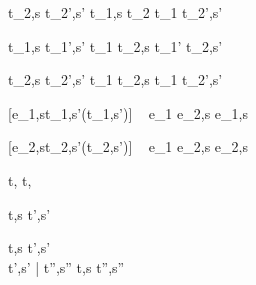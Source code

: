   {t_2,s  t_2',s'}
  {t_1,s \And t_2  t_1 \And t_2',s'}


  {t_1,s  t_1',s'}
  {t_1 \Or t_2,s  t_1' \Or t_2,s'}

  {t_2,s  t_2',s' }
  {t_1 \Or t_2,s  t_1 \Or t_2',s'}


[e_1,s\evaluate t_1,s'\wedge \neg\Failing(t_1,s')]
  {\ }
  {e_1 \Xor e_2,s \handle{\Left} e_1,s}

[e_2,s\evaluate t_2,s'\wedge \neg\Failing(t_2,s')]
  {\ }
  {e_1 \Xor e_2,s \handle{\Right} e_2,s}











  { }
  {t,\Sigma {} t,\Sigma}





  {t,s  t',s'}


  {t,s    t',s' \\
   t',s' \bar{\normalise} t'',s''}
  {t,s  t'',s''}
